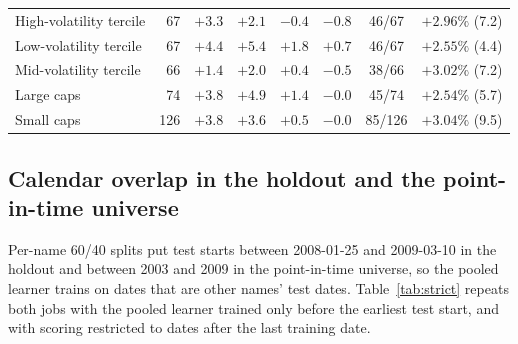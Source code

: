 \documentclass[11pt]{article}
\begin{document}
\begin{table}[htbp]
\begin{threeparttable}
\begin{tabular}{lrcccccc}
\midrule
High-volatility tercile & 67 & $+3.3$ & $+2.1$ & $-0.4$ & $-0.8$ & 46/67 & $+2.96\%$ (7.2) \\
Low-volatility tercile & 67 & $+4.4$ & $+5.4$ & $+1.8$ & $+0.7$ & 46/67 & $+2.55\%$ (4.4) \\
Mid-volatility tercile & 66 & $+1.4$ & $+2.0$ & $+0.4$ & $-0.5$ & 38/66 & $+3.02\%$ (7.2) \\
\midrule
Large caps & 74 & $+3.8$ & $+4.9$ & $+1.4$ & $-0.0$ & 45/74 & $+2.54\%$ (5.7) \\
Small caps & 126 & $+3.8$ & $+3.6$ & $+0.5$ & $-0.0$ & 85/126 & $+3.04\%$ (9.5) \\
\bottomrule\end{tabular}\end{threeparttable}\end{table}

\subsection*{Calendar overlap in the holdout and the point-in-time universe}
Per-name 60/40 splits put test starts between 2008-01-25 and 2009-03-10 in the holdout and between 2003 and 2009 in the point-in-time universe, so the pooled learner trains on dates that are other names' test dates. Table~\ref{tab:strict} repeats both jobs with the pooled learner trained only before the earliest test start, and with scoring restricted to dates after the last training date.
\end{document}
